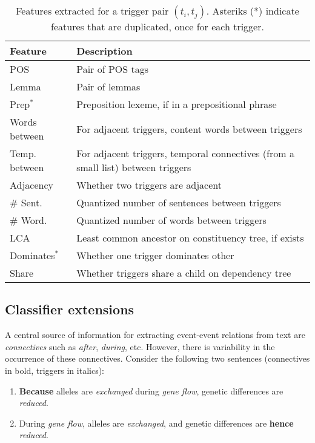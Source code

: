 \begin{table}[t]
{\footnotesize
\hfill{}
\begin{tabular}{|p{2.4cm}|p{4.7cm}|}
\hline
\textbf{Feature} &\textbf{Description}\\
\hline
 POS & Pair of POS tags \\
Lemma & Pair of lemmas \\
Prep$^*$ & Preposition lexeme, if in a prepositional phrase \\
Words between  & For adjacent triggers, content words between triggers \\
Temp. between & For adjacent triggers, temporal connectives (from a small list) between triggers \\
Adjacency & Whether two triggers are adjacent \\
\# Sent. & Quantized number of sentences between triggers \\
\# Word. & Quantized number of words between triggers \\
LCA & Least common ancestor on constituency tree, if exists \\
Dominates$^*$ & Whether one trigger dominates other \\
Share & Whether triggers share a child on dependency tree \\
\hline
\end{tabular}}
\hfill{}
\caption{Features extracted for a trigger pair $(t_i,t_j)$. Asteriks (*) indicate features that are duplicated, once for each trigger.}
\label{tab:features}
\end{table}

\subsection{Classifier extensions} \label{subsec:pairwise-novel}

A central source of information for extracting event-event relations from text are \emph{connectives} such as \emph{after}, \emph{during}, etc. However, there is variability in the occurrence of these connectives. Consider the following two sentences (connectives in bold, triggers in italics):

\begin{enumerate}[itemsep=0pt,topsep=0pt] 
\item \footnotesize \textbf{Because} alleles are \emph{exchanged} during \emph{gene flow}, genetic differences are \emph{reduced}. \label{sent:1}
\item \footnotesize During \emph{gene flow}, alleles are \emph{exchanged}, and genetic differences are \textbf{hence} \emph{reduced}. \label{sent:2}
\end{enumerate}

